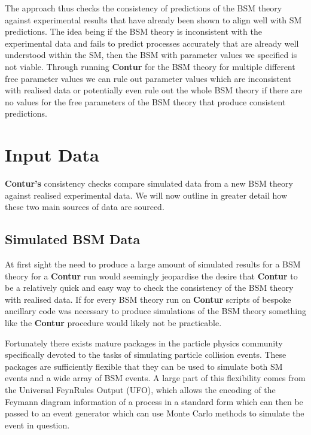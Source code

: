 The approach thus checks the consistency of predictions of the BSM theory against experimental results that have already been shown to align well with SM predictions. The idea being if the BSM theory is inconsistent with the experimental data and fails to predict processes accurately that are already well understood within the SM, then the BSM with parameter values we specified is not viable. Through running \textbf{Contur} for the BSM theory for multiple different free parameter values we can rule out parameter values which are inconsistent with realised data or potentially even rule out the whole BSM theory if there are no values for the free parameters of the BSM theory that produce consistent predictions.

\section{Input Data}\label{data}

\textbf{Contur's} consistency checks compare simulated data from a new BSM theory against realised experimental data. We will now outline in greater detail how these two main sources of data are sourced.

\subsection{Simulated BSM Data}

At first sight the need to produce a large amount of simulated results for a BSM theory for a \textbf{Contur} run would seemingly jeopardise the desire that \textbf{Contur} to be a relatively quick and easy way to check the consistency of the BSM theory with realised data. If for every BSM theory run on \textbf{Contur} scripts of bespoke ancillary code was necessary to produce simulations of the BSM theory something like the \textbf{Contur} procedure would likely not be practicable. 

Fortunately there exists mature packages in the particle physics community specifically devoted to the tasks of simulating particle collision events. These packages are sufficiently flexible that they can be used to simulate both SM events and a wide array of BSM events. A large part of this flexibility comes from the Universal FeynRules Output (UFO)\cite{ufo}, which allows the encoding of the Feymann diagram information of a process in a standard form which can then be passed to an event generator which can use Monte Carlo methods to simulate the event in question.

